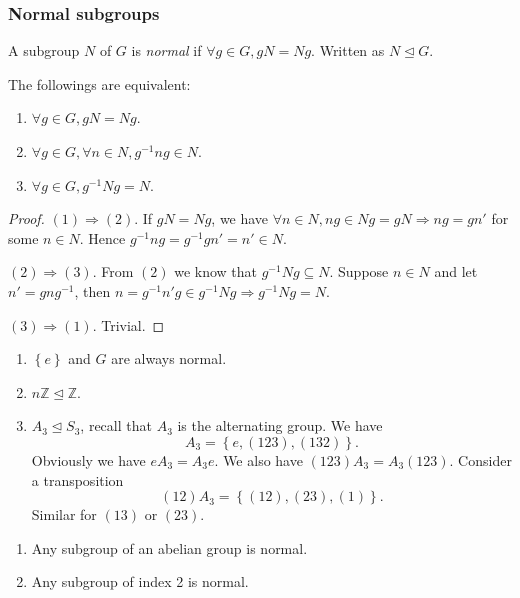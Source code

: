 \documentclass[a4paper]{article}
\begin{document}
\subsubsection{Normal subgroups}
\begin{definition}
  A subgroup $N$ of $G$ is \textit{normal} if $ \forall g\in G, gN=Ng
  $. Written as $ N \trianglelefteq G $.
\end{definition}
\begin{proposition}\label{prop:condition for normal groups}
  The followings are equivalent:
  \begin{enumerate}[(1)]
    \item $ \forall g\in G, gN=Ng $.
    \item $ \forall g\in G, \forall n\in N, g^{-1}ng\in N $.
    \item $ \forall g\in G, g^{-1}Ng=N $.
  \end{enumerate}
\end{proposition}
\begin{proof}
  $ (1)\Rightarrow (2) $. If $ gN=Ng $, we have $ \forall n\in N,
  ng\in Ng=gN \Rightarrow ng=gn' $ for some $n\in N$. Hence $
  g^{-1}ng=g^{-1}gn'=n'\in N $.

  $ (2) \Rightarrow (3) $. From $(2)$ we know that $ g^{-1}Ng
  \subseteq N $. Suppose $ n\in N $ and let $ n'=gng^{-1} $, then $
  n=g^{-1}n'g\in g^{-1}Ng \Rightarrow g^{-1}Ng = N $.

  $ (3) \Rightarrow (1) $. Trivial.
\end{proof}
\begin{example}
  \begin{enumerate}[(1)]
    \item $ \left\{ e\right\} $ and $G$ are always normal.
    \item $ n \mathbb{Z}\trianglelefteq \mathbb{Z}$.
    \item $ A_3 \trianglelefteq S_3 $, recall that $ A_3 $ is the
      alternating group. We have
      \[
        A_3=\left\{ e,(123),(132)\right\}
      .\]
      Obviously we have $ eA_3=A_3e $. We also have
      $(123)A_3=A_3(123)$. Consider a transposition
      \[
        (12)A_3=\left\{(12),(23),(1) \right\}
      .\]
      Similar for $(13)$ or $(23)$.
  \end{enumerate}
\end{example}
\begin{proposition}
  \begin{enumerate}[(1)]
    \item Any subgroup of an abelian group is normal.
    \item Any subgroup of index 2 is normal.
  \end{enumerate}
\end{proposition}
\end{document}
